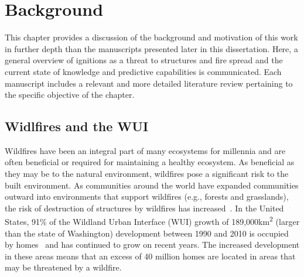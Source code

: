 
\chapter{Background}
\label{chap:literature}
    This chapter provides a discussion of the background and motivation of this work in further depth than the manuscripts presented later in this dissertation. Here, a general overview of ignitions as a threat to structures and fire spread and the current state of knowledge and predictive capabilities is communicated. Each manuscript includes a relevant and more detailed literature review pertaining to the specific objective of the chapter. 

\section{Widlfires and the WUI}
    Wildfires have been an integral part of many ecosystems for millennia and are often beneficial or required for maintaining a healthy ecosystem. As beneficial as they may be to the natural environment, wildfires pose a significant risk to the built environment. As communities around the world have expanded communities outward into environments that support wildfires (e.g., forests and grasslands), the risk of destruction of structures by wildfires has increased~\cite{Hammer2009DemographicManagement}. In the United States, 91\% of the Wildland Urban Interface (WUI)  growth of 189,000\si{\kilo\meter\squared} (larger than the state of Washington) development between 1990 and 2010 is occupied by homes~\cite{Radeloff2017} and has continued to grow on recent years. The increased development in these areas means that an excess of 40 million homes are located in areas that may be threatened by a wildfire. 
    
